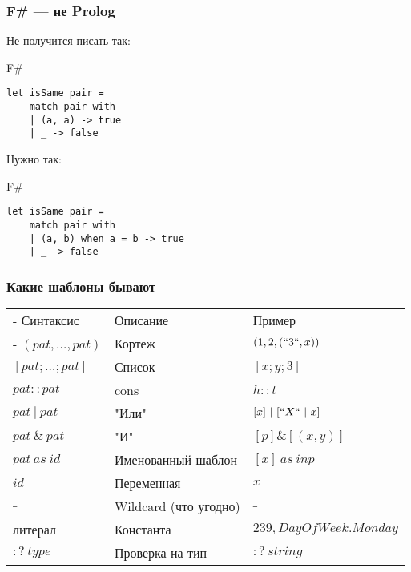 \documentclass[xetex,mathserif,serif]{beamer}
\begin{document}
	\begin{frame}[fragile]
		\frametitle{F\# --- не Prolog}
		Не получится писать так:
\begin{exampleblock}{F\#}
\begin{lstlisting}
let isSame pair =
    match pair with
    | (a, a) -> true
    | _ -> false
\end{lstlisting}
\end{exampleblock}
Нужно так:		
\begin{exampleblock}{F\#}
\begin{lstlisting}
let isSame pair =
    match pair with
    | (a, b) when a = b -> true
    | _ -> false
\end{lstlisting}
\end{exampleblock}
\end{frame}

	\begin{frame}
		\frametitle{Какие шаблоны бывают}
		\begin{small}
			\begin{tabu} {| X[0.9 l p] | X[1 l p] | X[1 l p] |}
				\tabucline-
				Синтаксис                               & Описание                  & Пример                                \\
				\tabucline-
				\everyrow{\tabucline-}
				$(pat, \ldots, pat)$                    & Кортеж                    & $(1, 2, (``3``, x))$                    \\
				$[pat; \ldots; pat]$                       & Список                    & $[x; y; 3]$                           \\
				$pat :: pat$                            & cons                      & $h :: t$                              \\
				$pat\ |\ pat$                             & "Или"                     & $[x]\ |\ [``X``\ |\ x]$                     \\
				$pat\ \&\ pat$                            & "И"                       & $[p] \& [(x, y)]$                     \\
				$pat\ as\ id$                             & Именованный шаблон        & $[x]\ as\ inp$                          \\
				$id$                                    & Переменная                & $x$                                   \\
				$\_$                                     & Wildcard (что угодно)     & $\_$                                   \\
				литерал                               & Константа                 & $239, DayOfWeek.Monday$ \\
				$:?\ type$                               & Проверка на тип           & $:?\ string$                           \\
			\end{tabu}
		\end{small}
	\end{frame}
\end{document}

